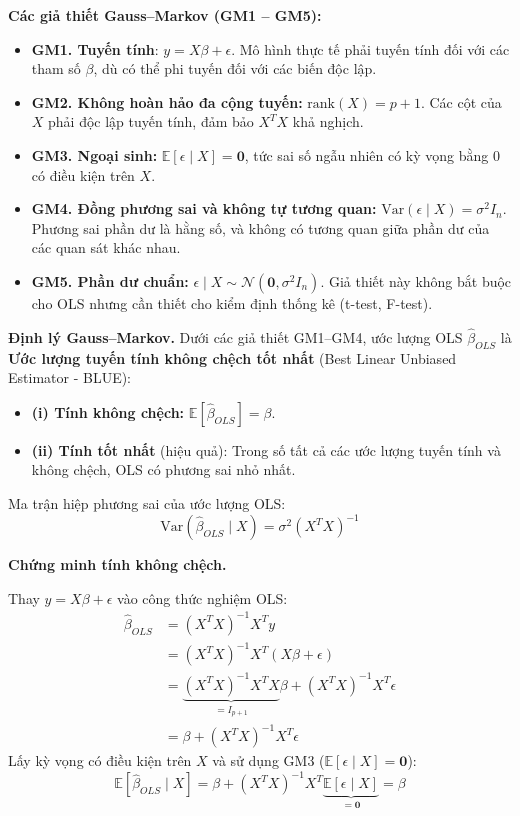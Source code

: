 \documentclass[a4paper]{article}
\begin{document}
\textbf{Các giả thiết Gauss--Markov (GM1 -- GM5):}
\begin{itemize}
    \item \textbf{GM1. Tuyến tính}: $y = X\beta + \epsilon$. Mô hình thực tế phải tuyến tính đối với các tham số $\beta$, dù có thể phi tuyến đối với các biến độc lập.
    \item \textbf{GM2. Không hoàn hảo đa cộng tuyến:} $\text{rank}(X) = p + 1$. Các cột của $X$ phải độc lập tuyến tính, đảm bảo $X^TX$ khả nghịch.
    \item \textbf{GM3. Ngoại sinh:} $\mathbb{E}[\epsilon \mid X] = \mathbf{0}$, tức sai số ngẫu nhiên có kỳ vọng bằng 0 có điều kiện trên $X$.
    \item \textbf{GM4. Đồng phương sai và không tự tương quan:} $\text{Var}(\epsilon \mid X) = \sigma^2 I_n$. Phương sai phần dư là hằng số, và không có tương quan giữa phần dư của các quan sát khác nhau.
    \item \textbf{GM5. Phần dư chuẩn:} $\epsilon \mid X \sim \mathcal{N}(\mathbf{0}, \sigma^2 I_n)$. Giả thiết này không bắt buộc cho OLS nhưng cần thiết cho kiểm định thống kê (t-test, F-test).
\end{itemize}

\textbf{Định lý Gauss--Markov.} Dưới các giả thiết GM1--GM4, ước lượng OLS $\hat{\beta}_{OLS}$ là \textbf{Ước lượng tuyến tính không chệch tốt nhất} (Best Linear Unbiased Estimator - BLUE):
\begin{itemize}
    \item \textbf{(i) Tính không chệch:} $\mathbb{E}[\hat{\beta}_{OLS}] = \beta$.
    \item \textbf{(ii) Tính tốt nhất} (hiệu quả): Trong số tất cả các ước lượng tuyến tính và không chệch, OLS có phương sai nhỏ nhất.
\end{itemize}

Ma trận hiệp phương sai của ước lượng OLS:
\begin{equation}
\text{Var}(\hat{\beta}_{OLS} \mid X) = \sigma^2 (X^TX)^{-1}
\end{equation}

\textbf{Chứng minh tính không chệch.}

Thay $y = X\beta + \epsilon$ vào công thức nghiệm OLS:
\begin{align*}
\hat{\beta}_{OLS} &= (X^TX)^{-1}X^Ty \\
                   &= (X^TX)^{-1}X^T(X\beta + \epsilon) \\
                   &= \underbrace{(X^TX)^{-1}X^TX}_{=I_{p+1}}\beta + (X^TX)^{-1}X^T\epsilon \\
                   &= \beta + (X^TX)^{-1}X^T\epsilon
\end{align*}
Lấy kỳ vọng có điều kiện trên $X$ và sử dụng GM3 ($\mathbb{E}[\epsilon \mid X] = \mathbf{0}$):
$$\mathbb{E}[\hat{\beta}_{OLS} \mid X] = \beta + (X^TX)^{-1}X^T \underbrace{\mathbb{E}[\epsilon \mid X]}_{=\mathbf{0}} = \beta$$
\end{document}
